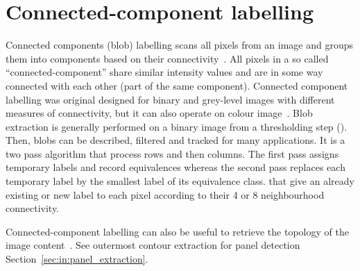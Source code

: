 \section*{Connected-component labelling} %
\label{sec:ap:connected_component_labelling}
Connected components (blob) labelling scans all pixels from an image and groups them into components based on their connectivity~\cite{Szeliski2010Computer}.
All pixels in a so called ``connected-component'' share similar intensity values and are in some way connected with each other (part of the same component).
Connected component labelling was original designed for binary and grey-level images with different measures of connectivity, but it can also operate on colour image~\cite{dillencourt1992general}.
Blob extraction is generally performed on a binary image from a thresholding step ().
Then, blobs can be described, filtered and tracked for many applications.
It is a two pass algorithm that process rows and then columns.
The first pass assigns temporary labels and record equivalences whereas the second pass replaces each temporary label by the smallest label of its equivalence class. that give an already existing or new label to each pixel according to their 4 or 8 neighbourhood connectivity.

Connected-component labelling can also be useful to retrieve the topology of the image content~\cite{suzuki1985topological}.
See outermost contour extraction for panel detection Section~\ref{sec:in:panel_extraction}.






